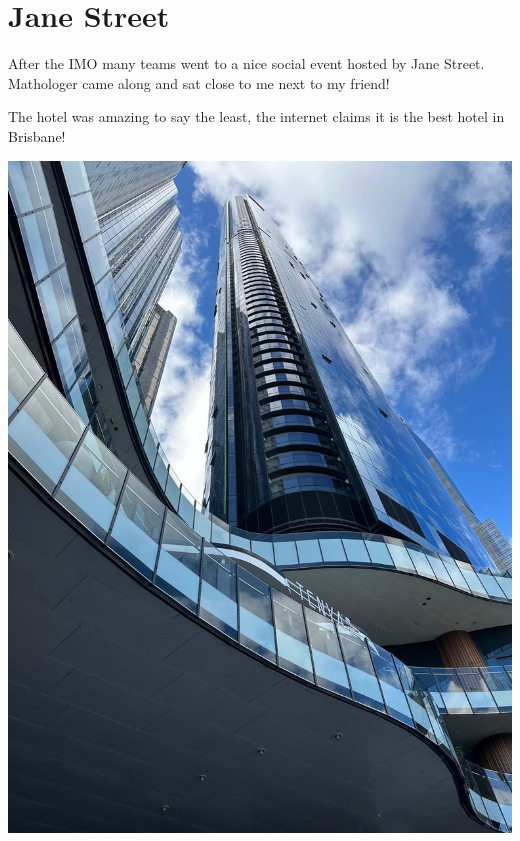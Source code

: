 \documentclass{article}
\begin{document}
\section{Jane Street}

After the IMO many teams went to a nice social event hosted by Jane Street. Mathologer came along and sat close to me next to my friend!

The hotel was amazing to say the least, the internet claims it is the best hotel in Brisbane!

\begin{center}
  \includegraphics[scale=0.1]{assets/brisbane-hotel-jane.jpeg}

\end{center}
\end{document}
